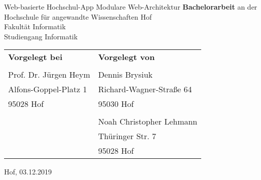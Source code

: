 \thispagestyle{empty}
\begin{titlepage}
\begin{center}
{\Large Web-basierte Hochschul-App}
\linebreak
{\large Modulare Web-Architektur}
\linebreak
\linebreak
{\large \textbf{Bachelorarbeit}}
\linebreak
\linebreak
an der Hochschule für angewandte Wissenschaften Hof
\\
Fakultät Informatik
\\
Studiengang Informatik
\linebreak
\linebreak

\end{center}
\begin{tabular}{p{}l}
\textbf{Vorgelegt bei} 			&
\textbf{Vorgelegt von} 			\\
								&
								\\
Prof. Dr. Jürgen Heym 			&
Dennis Brysiuk 					\\
Alfons-Goppel-Platz 1 			&
Richard-Wagner-Straße 64 		\\
95028 Hof 						&
95030 Hof						\\
								&
								\\
								&
Noah Christopher Lehmann		\\
								&
Thüringer Str. 7				\\
								&
95028 Hof						
\end{tabular}
\linebreak
\linebreak
\begin{center}
Hof, 03.12.2019
\end{center}
\restoregeometry
\end{titlepage}